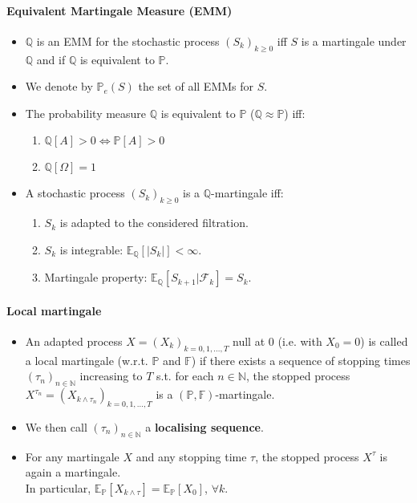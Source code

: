 \documentclass[a4paper,landscape,8pt,fleqn]{scrartcl}
\renewcommand{\emph}[1]{\textbf{#1}}
\begin{document}
\begin{multicols*}{3}
\paragraph{Equivalent Martingale Measure (EMM)}

\begin{itemize}
\item $\mathbb{Q}$ is an EMM for the stochastic process $(S_k)_{k \geq 0}$ iff $S$ is a martingale under $\mathbb{Q}$ and if $\mathbb{Q}$ is equivalent to $\mathbb{P}$.
\item We denote by $\mathbb{P}_e(S)$ the set of all EMMs for $S$.
\item The probability measure $\mathbb{Q}$ is equivalent to $\mathbb{P}$ ($\mathbb{Q} \approx \mathbb{P}$) iff:
\begin{enumerate}
\item $\mathbb{Q}[A] > 0 \iff \mathbb{P}[A] > 0$
\item $\mathbb{Q}[\Omega] = 1$
\end{enumerate}
\item A stochastic process $(S_k)_{k \geq 0}$ is a $\mathbb{Q}$-martingale iff:
\begin{enumerate}
\item $S_k$ is adapted to the considered filtration.
\item $S_k$ is integrable: $\mathbb{E}_\mathbb{Q}[|S_k|] < \infty$.
\item Martingale property: $\mathbb{E}_\mathbb{Q}[S_{k+1} | \mathcal{F}_k] = S_k$.
\end{enumerate}
\end{itemize}

\paragraph{Local martingale}

\begin{itemize}
\item An adapted process $X = (X_k)_{k=0,1, \ldots, T}$ null at 0 (i.e. with $X_0 = 0$) is called a local martingale (w.r.t. $\mathbb{P}$ and $\mathbb{F}$) if there exists a sequence of stopping times $(\tau_n)_{n \in \mathbb{N}}$ increasing to $T$ s.t. for each $n \in \mathbb{N}$, the stopped process $X^{\tau_n} = (X_{k \wedge \tau_n})_{k=0,1, \ldots, T}$ is a $(\mathbb{P}, \mathbb{F})$-martingale.
\item We then call $(\tau_n)_{n \in \mathbb{N}}$ a \emph{localising sequence}.
\item For any martingale $X$ and any stopping time $\tau$, the stopped process $X^\tau$ is again a martingale. \\
In particular, $\mathbb{E}_\mathbb{P}[X_{k \wedge \tau}] = \mathbb{E}_\mathbb{P}[X_0]$, $\forall k$.
\end{itemize}


\end{multicols*}
\end{document}
